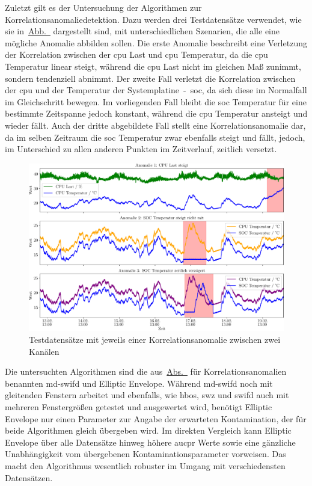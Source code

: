 Zuletzt gilt es der Untersuchung der Algorithmen zur Korrelationsanomaliedetektion. Dazu werden drei Testdatensätze verwendet, wie sie
in~\hyperref[fig:korrelationsanomalie_datensätze]{Abb.~} dargestellt sind, mit unterschiedlichen
Szenarien, die alle eine mögliche Anomalie abbilden sollen. Die erste Anomalie beschreibt eine Verletzung der Korrelation zwischen der
\ac{cpu} Last und \ac{cpu} Temperatur, da die \ac{cpu} Temperatur linear steigt, während die \ac{cpu} Last nicht im gleichen Maß zunimmt, sondern tendenziell abnimmt.
Der zweite Fall verletzt die Korrelation zwischen der \ac{cpu} und der Temperatur der Systemplatine~-~\ac{soc}, da sich diese im
Normalfall im Gleichschritt bewegen. Im vorliegenden Fall bleibt die \ac{soc} Temperatur für eine bestimmte Zeitspanne jedoch konstant, während die
\ac{cpu} Temperatur ansteigt und wieder fällt. Auch der dritte abgebildete Fall stellt eine Korrelationsanomalie dar, da im selben Zeitraum die
\ac{soc} Temperatur zwar ebenfalls steigt und fällt, jedoch, im Unterschied zu allen anderen Punkten im Zeitverlauf, zeitlich versetzt.

\begin{figure}[b!]
    \centering
     \includegraphics[width=1\linewidth]{ch5_anomalieerkennung/abbildungen/korrealtionsanomalien_daten.pdf}
    \caption{Testdatensätze mit jeweils einer Korrelationsanomalie zwischen zwei Kanälen}
    \label{fig:korrelationsanomalie_datensätze}
\end{figure}

Die untersuchten Algorithmen sind die aus~\hyperref[sec:algorithmen]{Abs.~} für Korrelationsanomalien benannten \ac{md-swifd} und Elliptic
Envelope. Während \ac{md-swifd} noch mit gleitenden Fenstern arbeitet und ebenfalls, wie \ac{hbos}, \ac{swz} und \ac{swifd} auch mit mehreren Fenstergrößen getestet und
ausgewertet wird, benötigt Elliptic Envelope nur einen Parameter zur Angabe der erwarteten Kontamination, der für beide Algorithmen gleich übergeben wird.
Im direkten Vergleich kann Elliptic Envelope über alle Datensätze hinweg höhere \ac{aucpr} Werte  sowie eine gänzliche Unabhängigkeit vom übergebenen
Kontaminationsparameter vorweisen. Das macht den Algorithmus wesentlich robuster im Umgang mit verschiedensten Datensätzen.

